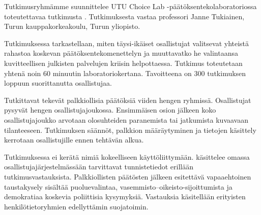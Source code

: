 
\renewcommand{\StudyTitle}{\StudyTitleFI}
\setlength{\emergencystretch}{2em}



Tutkimusryhmämme suunnittelee UTU Choice Lab -päätöksentekolaboratoriossa toteutettavaa tutkimusta \emph{\StudyTitleFI}. Tutkimuksesta vastaa professori Janne Tukiainen, Turun kauppakorkeakoulu, Turun yliopisto.

Tutkimuksessa tarkastellaan, miten täysi-ikäiset osallistujat valitsevat yhteistä rahastoa koskevan päätöksentekomenettelyn ja muuttavatko he valintaansa kuvitteellisen julkisten palvelujen kriisin helpottaessa. Tutkimus toteutetaan yhtenä noin 60 minuutin laboratoriokertana. Tavoitteena on 300 tutkimuksen loppuun suorittanutta osallistujaa.

Tutkittavat tekevät palkkiollisia päätöksiä viiden hengen ryhmissä.  Osallistujat pysyvät  hengen osallistujajoukossa. Ensimmäisen osion jälkeen koko osallistujajoukko arvotaan olosuhteiden paranemista tai jatkumista kuvaavaan tilanteeseen. Tutkimuksen säännöt, palkkion määräytyminen ja tietojen käsittely kerrotaan osallistujille ennen tehtävän alkua.

Tutkimuksessa ei kerätä nimiä kokeelliseen käyttöliittymään.  käsittelee omassa osallistujajärjestelmässään  tarvittavat tunnistetiedot erillään tutkimusvastauksista.  Palkkiollisten päätösten jälkeen esitettävä vapaaehtoinen taustakysely sisältää puoluevalintaa, vasemmisto--oikeisto-sijoittumista ja demokratiaa koskevia poliittisia kysymyksiä. Vastauksia käsitellään erityisten henkilötietoryhmien edellyttämin suojatoimin. 

